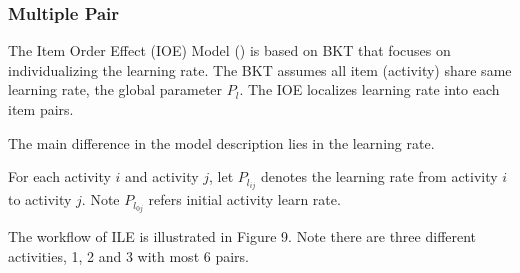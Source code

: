 \documentclass{article}
\begin{document}
\begin{center}
\end{center}


\subsubsection{Multiple Pair}

The Item Order Effect (IOE) Model (\cite{multipair}) is based on BKT that focuses on individualizing the learning rate. The BKT assumes all item (activity) share same learning rate, the global parameter \( P_l \). The IOE localizes learning rate into each item pairs.

The main difference in the model description lies in the learning rate.

For each activity \( i \) and activity \( j \), let \( P_{l_{ij}} \) denotes the learning rate from activity \( i \) to activity \( j \). Note \( P_{l_{0j}} \) refers initial activity learn rate.

The workflow of ILE is illustrated in Figure 9. Note there are three different activities, 1, 2 and 3 with most 6 pairs.
\end{document}
